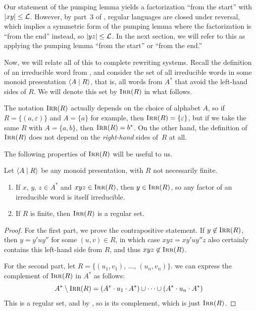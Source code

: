 \documentclass[../generics]{subfiles}
\begin{document}
\begin{remark}
Our statement of the pumping lemma yields a factorization ``from the start'' with $|xy| \leq \mathcal{L}$. However, by part~3 of , regular languages are closed under reversal, which implies a symmetric form of the pumping lemma where the factorization is ``from the end'' instead, so $|yz| \leq \mathcal{L}$. In the next section, we will refer to this as applying the pumping lemma ``from the start'' or ``from the end.''
\end{remark}

Now, we will relate all of this to complete rewriting systems. Recall the definition of an irreducible word from , and consider the set of all irreducible words in some monoid presentation $\langle A \mid R\rangle$, that is, all words from $A^*$ that avoid the left-hand sides of $R$. We will denote this set by $\textsc{Irr}(R)$ in what follows.

\begin{remark}
The notation $\textsc{Irr}(R)$ actually depends on the choice of alphabet $A$, so if $R=\{(a,\varepsilon)\}$ and $A=\{a\}$ for example, then $\textsc{Irr}(R) = \{ \varepsilon \}$, but if we take the same $R$ with $A=\{a,b\}$, then $\textsc{Irr}(R)=b^*$. On the other hand, the definition of $\textsc{Irr}(R)$ does not depend on the \emph{right-hand} sides of~$R$ at all.
\end{remark}

The following properties of $\textsc{Irr}(R)$ will be useful to us.

\begin{lemma}\label{irr r facts}
Let $\langle A \mid R\rangle$ be any monoid presentation, with $R$ not necessarily finite.
\begin{enumerate}
\item If $x$, $y$, $z \in A^*$ and $xyz \in \textsc{Irr}(R)$, then $y \in \textsc{Irr}(R)$, so any factor of an irreducible word is itself irreducible.
\item If $R$ is finite, then $\textsc{Irr}(R)$ is a regular set.
\end{enumerate}
\end{lemma}
\begin{proof}
For the first part, we prove the contrapositive statement. If $y \not\in \textsc{Irr}(R)$, then $y=y'uy''$ for some $(u, v) \in R$, in which case $xyz=xy'uy''z$ also certainly contains this left-hand side from $R$, and thus $xyz \not\in \textsc{Irr}(R)$.

For the second part, let $R = \{ (u_1, v_1), \, \ldots, \, (u_n, v_n) \}$. we can express the complement of $\textsc{Irr}(R)$ in $A^*$ as follows:
\[
A^* \setminus \textsc{Irr}(R) = (A^* \cdot u_1 \cdot A^*) \cup \cdots \cup (A^* \cdot u_n \cdot A^*)
\]
This is a regular set, and by , so is its complement, which is just $\textsc{Irr}(R)$.
\end{proof}
\end{document}
